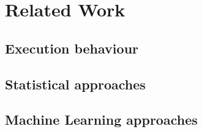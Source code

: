 \chapter{Related Work}

\section{Execution behaviour}

\section{Statistical approaches}

\section{Machine Learning approaches}